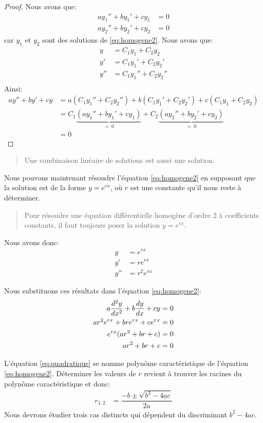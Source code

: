 \documentclass[]{book}
\theoremstyle{definition}
\theoremstyle{definition}
\theoremstyle{definition}
\theoremstyle{remark}
\let\BeginKnitrBlock\begin \let\EndKnitrBlock\end
\begin{document}
\BeginKnitrBlock{proof}
{}Nous avons que: \begin{align*}
ay_1''+by_1'+cy_1 &= 0 \\
ay_2''+by_2'+cy_2 &= 0
\end{align*} car \(y_1\) et \(y_2\) sont des solutions de
\eqref{eq:homogene2}. Nous avons que: \begin{align*}
y &= C_1y_1+C_2y_2 \\
y' &= C_1y_1'+C_2y_2' \\
y'' &= C_1y_1''+C_2y_2'' \\
\end{align*} Ainsi: \begin{align*}
ay''+by'+cy &= a(C_1y_1''+C_2y_2'')+b(C_1y_1'+C_2y_2')+c(C_1y_1+C_2y_2) \\
&= C_1\underbrace{(ay_1''+by_1'+cy_1)}_{=\ 0}+C_2\underbrace{(ay_2''+by_2'+cy_2)}_{=\ 0} \\
&= 0
\end{align*}
\EndKnitrBlock{proof}

\begin{quote}
Une combinaison linéaire de solutions est aussi une solution.
\end{quote}

Nous pouvons maintenant résoudre l'équation \eqref{eq:homogene2} en
supposant que la solution est de la forme \(y=e^{rx}\), où \(r\) est une
constante qu'il nous reste à déterminer.

\begin{quote}
Pour résoudre une équation différentielle homogène d'ordre 2 à
coefficients constants, il faut toujours poser la solution \(y=e^{rx}\).
\end{quote}

Nous avons donc: \begin{align*}
y &= e^{rx} \\
y' &= re^{rx} \\
y'' &= r^2e^{rx}
\end{align*}

Nous substituons ces résultats dans l'équation \eqref{eq:homogene2}:
\begin{align}
a\dfrac{d^2y}{dx^2}+b\dfrac{dy}{dx}+cy &= 0 \notag \\
ar^2e^{rx}+bre^{rx}+ce^{rx} &= 0 \notag \\
e^{rx}(ar^2+br+c) &= 0 \notag \\
ar^2+br+c &= 0\label{eq:quadratique}
\end{align}

L'équation \eqref{eq:quadratique} se nomme polynôme caractéristique de
l'équation \eqref{eq:homogene2}. Déterminer les valeurs de \(r\) revient à
trouver les racines du polynôme caractéristique et donc: \begin{align*}
r_{1,2} &= \dfrac{-b\pm\sqrt{b^2-4ac}}{2a}
\end{align*} Nous devrons étudier trois cas distincts qui dépendent du
discriminant \(b^2-4ac\).
\end{document}
